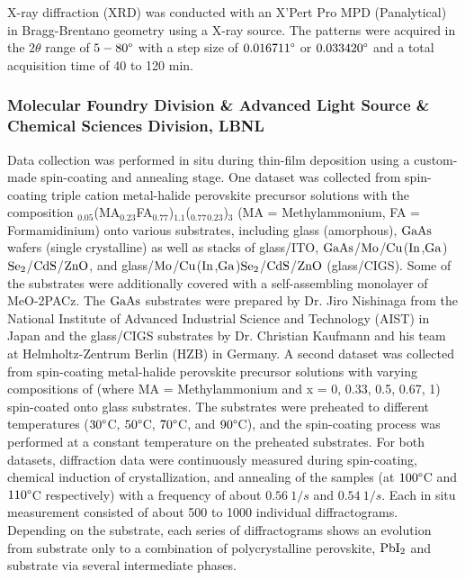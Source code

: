 X-ray diffraction (XRD) was conducted with an X’Pert Pro MPD (Panalytical) in Bragg-Brentano geometry using a  X-ray source. The patterns were acquired in the $2\theta$ range of $5-80\degree$ with a step size of $0.016711\degree$ or $0.033420\degree$ and a total acquisition time of 40 to 120 min. \\



\subsubsection*{Molecular Foundry Division \& Advanced Light Source \& Chemical Sciences Division, LBNL}

Data collection was performed in situ during thin-film deposition using a custom-made spin-coating and annealing stage. One dataset was collected from spin-coating triple cation metal-halide perovskite precursor solutions with the composition 
$_{0.05}$(MA$_{0.23}$FA$_{0.77}$)$_{1.1}$($_{0.77}$$_{0.23}$)$_{3}$ (MA = Methylammonium, FA = Formamidinium) onto various substrates, including glass (amorphous), $\ce{GaAs}$ wafers (single crystalline) as well as stacks of glass/ITO, $\ce{GaAs}$/$\ce{Mo}$/$\ce{Cu}$($\ce{In}$,$\ce{Ga}$)$\ce{Se2}$/$\ce{CdS}$/$\ce{ZnO}$, and glass/$\ce{Mo}$/$\ce{Cu}$($\ce{In}$,$\ce{Ga}$)$\ce{Se2}$/$\ce{CdS}$/$\ce{ZnO}$ (glass/CIGS). Some of the substrates were additionally covered with a self-assembling monolayer of MeO-2PACz. The $\ce{GaAs}$ substrates were prepared by Dr. Jiro Nishinaga from the National Institute of Advanced Industrial Science and Technology (AIST) in Japan and the glass/CIGS substrates by Dr. Christian Kaufmann and his team at Helmholtz-Zentrum Berlin (HZB) in Germany. A second dataset was collected from spin-coating metal-halide perovskite precursor solutions with varying compositions of  (where MA = Methylammonium and x = 0, 0.33, 0.5, 0.67, 1) spin-coated onto glass substrates. The substrates were preheated to different temperatures ($30\degree $C, $50\degree $C, $70\degree $C, and $90\degree $C), and the spin-coating process was performed at a constant temperature on the preheated substrates. For both datasets, diffraction data were continuously measured during spin-coating, chemical induction of crystallization, and annealing of the samples (at $100\degree$C and $110\degree$C respectively) with a frequency of about $0.56 
 \ 1/\si{s}$ and $0.54 \ 1/\si{s}$. Each in situ measurement consisted of about 500 to 1000 individual diffractograms. Depending on the substrate, each series of diffractograms shows an evolution from substrate only to a combination of polycrystalline perovskite, $\ce{PbI2}$ and substrate via several intermediate phases. \\

